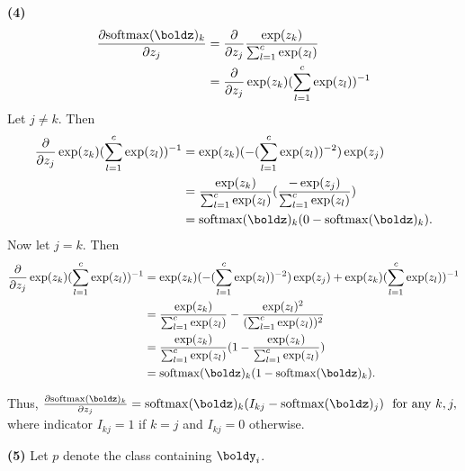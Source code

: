 \documentclass[submit]{harvardml}
\begin{document}
\noindent\textbf{(4)} 
\begin{align*}
\frac{\partial \mathrm{softmax}(\boldz)_k }{\partial z_j} &= \frac{\partial}{\partial z_j} \frac{\exp(z_k)}{\sum_{l=1}^c \exp(z_l)}\\
&= \frac{\partial}{\partial z_j} \exp(z_k) (\sum_{l=1}^c \exp(z_l))^{-1}\\
\end{align*}
Let $j \neq k$. Then
\begin{align*}
\frac{\partial}{\partial z_j} \exp(z_k) (\sum_{l=1}^c \exp(z_l))^{-1} &= \exp(z_k) (- (\sum_{l=1}^c\exp(z_l))^{-2})\exp(z_j)\\
&= \frac{\exp(z_k)}{\sum_{l=1}^c \exp(z_l)}( \frac{-\exp(z_j)}{\sum_{l=1}^c \exp(z_l)})\\
&= \mathrm{softmax}(\boldz)_k (0- \mathrm{softmax}(\boldz)_k).
\end{align*}
Now let $j = k$. Then
\begin{align*}
\frac{\partial}{\partial z_j} \exp(z_k) (\sum_{l=1}^c \exp(z_l))^{-1} &= \exp(z_k) (- (\sum_{l=1}^c\exp(z_l))^{-2})\exp(z_j) + \exp(z_k)(\sum_{l=1}^c \exp(z_l))^{-1}\\
&= \frac{\exp(z_k)}{\sum_{l=1}^c \exp(z_l)} - \frac{\exp(z_l)^2}{(\sum_{l=1}^c \exp(z_l))^2} \\
&= \frac{\exp(z_k)}{\sum_{l=1}^c \exp(z_l)} (1 - \frac{\exp(z_k)}{\sum_{l=1}^c \exp(z_l)})\\
&= \mathrm{softmax}(\boldz)_k (1 - \mathrm{softmax}(\boldz)_k).
\end{align*} 

Thus, $\frac{\partial \mathrm{softmax}(\boldz)_k }{\partial z_j} = \mathrm{softmax}(\boldz)_k (I_{kj} - \mathrm{softmax}(\boldz)_j) \ \ \text{for\ any\ } k, j,  $
where indicator $I_{kj}=1$ if $k=j$ and $I_{kj}=0$ otherwise.
 

 
\bigskip

\noindent\textbf{(5)} Let $p$ denote the class containing $\boldy_i$.

\end{document}
